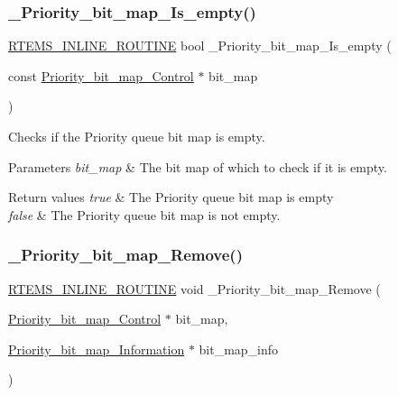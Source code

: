 \subsubsection{\texorpdfstring{\_Priority\_bit\_map\_Is\_empty()}{\_Priority\_bit\_map\_Is\_empty()}}
{\footnotesize\ttfamily \mbox{\hyperlink{group__RTEMSScoreBaseDefs_gac216239df231d5dbd15e3520b0b9313f}{R\+T\+E\+M\+S\+\_\+\+I\+N\+L\+I\+N\+E\+\_\+\+R\+O\+U\+T\+I\+NE}} bool \+\_\+\+Priority\+\_\+bit\+\_\+map\+\_\+\+Is\+\_\+empty (\begin{DoxyParamCaption}\item[{const \mbox{\hyperlink{structPriority__bit__map__Control}{Priority\+\_\+bit\+\_\+map\+\_\+\+Control}} $\ast$}]{bit\+\_\+map }\end{DoxyParamCaption})}



Checks if the Priority queue bit map is empty. 


\begin{DoxyParams}{Parameters}
{\em bit\+\_\+map} & The bit map of which to check if it is empty.\\
\hline
\end{DoxyParams}

\begin{DoxyRetVals}{Return values}
{\em true} & The Priority queue bit map is empty \\
\hline
{\em false} & The Priority queue bit map is not empty. \\
\hline
\end{DoxyRetVals}
\mbox{\label{group__RTEMSScorePriority_gab4a3b896e05ca0e5b2b1227e851447f8}} 
\subsubsection{\texorpdfstring{\_Priority\_bit\_map\_Remove()}{\_Priority\_bit\_map\_Remove()}}
{\footnotesize\ttfamily \mbox{\hyperlink{group__RTEMSScoreBaseDefs_gac216239df231d5dbd15e3520b0b9313f}{R\+T\+E\+M\+S\+\_\+\+I\+N\+L\+I\+N\+E\+\_\+\+R\+O\+U\+T\+I\+NE}} void \+\_\+\+Priority\+\_\+bit\+\_\+map\+\_\+\+Remove (\begin{DoxyParamCaption}\item[{\mbox{\hyperlink{structPriority__bit__map__Control}{Priority\+\_\+bit\+\_\+map\+\_\+\+Control}} $\ast$}]{bit\+\_\+map,  }\item[{\mbox{\hyperlink{structPriority__bit__map__Information}{Priority\+\_\+bit\+\_\+map\+\_\+\+Information}} $\ast$}]{bit\+\_\+map\+\_\+info }\end{DoxyParamCaption})}



